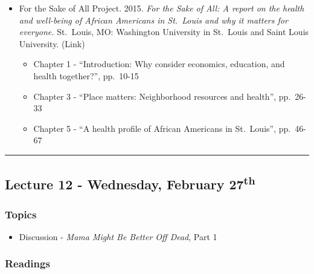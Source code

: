 \documentclass[]{book}
\providecommand{\tightlist}{%
  \setlength{\itemsep}{0pt}\setlength{\parskip}{0pt}}
\begin{document}
\begin{itemize}
\tightlist
\item
  For the Sake of All Project. 2015. \emph{For the Sake of All: A report on the health and well-being of African Americans in St.~Louis and why it matters for everyone.} St.~Louis, MO: Washington University in St.~Louis and Saint Louis University. (Link)

  \begin{itemize}
  \tightlist
  \item
    Chapter 1 - ``Introduction: Why consider economics, education, and health together?'', pp.~10-15
  \item
    Chapter 3 - ``Place matters: Neighborhood resources and health'', pp.~26-33
  \item
    Chapter 5 - ``A health profile of African Americans in St.~Louis'', pp.~46-67
  \end{itemize}
\end{itemize}

\begin{center}\rule{0.5\linewidth}{\linethickness}\end{center}

\hypertarget{lecture-12---wednesday-february-27th}{%
\subsection*{\texorpdfstring{Lecture 12 - Wednesday, February 27\textsuperscript{th}}{Lecture 12 - Wednesday, February 27th}}\label{lecture-12---wednesday-february-27th}}

\hypertarget{topics-13}{%
\subsubsection*{Topics}\label{topics-13}}

\begin{itemize}
\tightlist
\item
  Discussion - \emph{Mama Might Be Better Off Dead}, Part 1
\end{itemize}

\hypertarget{readings-12}{%
\subsubsection*{Readings}\label{readings-12}}
\end{document}
